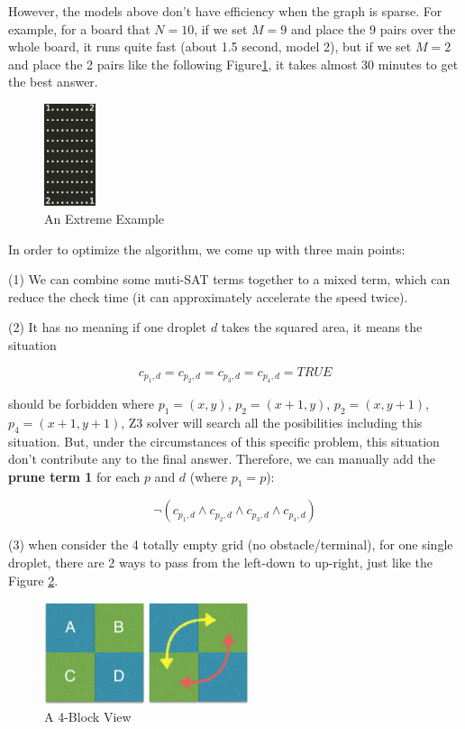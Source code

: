 \documentclass[twocolumn]{article}
\begin{document}
However, the models above don't have efficiency when the graph is sparse. For example, for a board that $N=10$, if we set $M=9$ and place the 9 pairs over the whole board, it runs quite fast (about 1.5 second, model 2), but if we set $M=2$ and place the 2 pairs like the following Figure\ref{aee}, it takes almost 30 minutes to get the best answer.

\begin{figure}
    \centering
    \includegraphics[height = 3cm]{example}
    \caption{An Extreme Example}
    \label{aee}
\end{figure}

\newpage

In order to optimize the algorithm, we come up with three main points:

(1) We can combine some muti-SAT terms together to a mixed term, which can reduce the check time (it can approximately accelerate the speed twice).

(2) It has no meaning if one droplet $d$ takes the squared area, it means the situation

\[
c_{p_1, d} = c_{p_2, d} = c_{p_3, d} = c_{p_4, d} = TRUE
\]

should be forbidden where $p_1 = (x, y)$, $p_2 = (x + 1, y)$, $p_2 = (x, y + 1)$, $p_4 = (x + 1, y + 1)$, Z3 solver will search all the posibilities including this situation. But, under the circumstances of this specific problem, this situation don't contribute any to the final answer. Therefore, we can manually add the \textbf{prune term 1} for each $p$ and $d$ (where $p_1 = p$):

\[
\neg(c_{p_1, d} \wedge c_{p_2, d} \wedge c_{p_3, d} \wedge c_{p_4, d})
\]

(3) when consider the 4 totally empty grid (no obstacle/terminal), for one single droplet, there are 2 ways to pass from the left-down to up-right, just like the Figure \ref{a4v}.

\begin{figure}
    \centering
    \includegraphics[height = 3cm]{example2}
    \caption{A 4-Block View}
    \label{a4v}
\end{figure}
\end{document}
